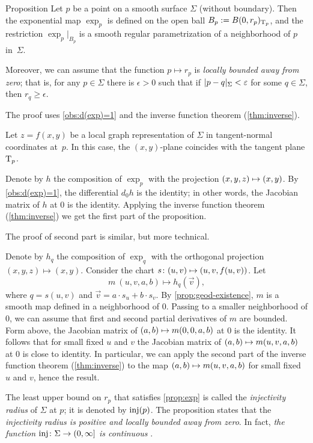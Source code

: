 \begin{thm}{Proposition}\label{prop:exp}
Let $p$ be a point on a smooth surface $\Sigma$ (without boundary).
Then the exponential map $\exp_p$ is defined on the open ball $B_p\mathrel{:=} B(0,r_p)_{\mathrm{T}_p}$,
and the restriction $\exp_p|_{B_p}$ is a smooth regular parametrization of a neighborhood of $p$ in~$\Sigma$.

Moreover, we can assume that the function $p\mapsto r_p$ is {}\emph{locally bounded away from zero};
that is, for any $p\in\Sigma$ there is $\epsilon>0$ such that if $\dist{p}{q}\Sigma<\epsilon$ for some $q\in \Sigma$, then $r_q\ge\epsilon$.
\end{thm}

The proof uses \ref{obs:d(exp)=1} and the inverse function theorem (\ref{thm:inverse}).

Let $z=f(x,y)$ be a local graph representation of $\Sigma$ in tangent-normal coordinates at~$p$.
In this case, the $(x,y)$-plane coincides with the tangent plane $\mathrm{T}_p$.

Denote by $h$ the composition of $\exp_p$ with the projection $(x,y,z)\z\mapsto (x,y)$.
By \ref{obs:d(exp)=1}, the differential $d_0h$ is the identity;
in other words, the Jacobian matrix of $h$ at $0$ is the identity.
Applying the inverse function theorem (\ref{thm:inverse}) we get the first part of the proposition.

The proof of second part is similar, but more technical.

Denote by $h_q$ the composition of $\exp_q$ with the orthogonal projection $(x,y,z)\mapsto (x,y)$.
Consider the chart $s\:(u,v)\z\mapsto (u,v,f(u,v))$.
Let
\[m\:(u,v,a,b)\mapsto h_q(\vec v),\]
where $q=s(u,v)$ and $\vec v=a\cdot s_u+b\cdot s_v$.
By \ref{prop:geod-existence}, $m$ is a smooth map defined in a neighborhood of $0$.
Passing to a smaller neighborhood of $0$, we can assume that first and second partial derivatives of $m$ are bounded.
Form above, the Jacobian matrix of $(a,b)\z\mapsto m(0,0,a,b)$ at $0$ is the identity.
It follows that for small fixed $u$ and $v$
the Jacobian matrix of $(a,b)\z\mapsto m(u,v,a,b)$ at $0$ is close to identity.
In particular, we can apply the second part of the inverse function theorem (\ref{thm:inverse}) to
the map $(a,b)\z\mapsto m(u,v,a,b)$  for small fixed $u$ and $v$, hence the result.
\qeds

The least upper bound on $r_p$ that satisfies \ref{prop:exp} is called the \emph{injectivity radius} of $\Sigma$ at $p$;
it is denoted by $\mathop{\rm inj}\nolimits(p)$.
The proposition states that the \textit{injectivity radius is positive and locally bounded away from zero}.
In fact, \textit{the function $\mathop{\rm inj}\nolimits\colon\Sigma\to (0,\infty]$ is continuous} \cite[5.4]{gromoll-klingenberg-meyer}. 

